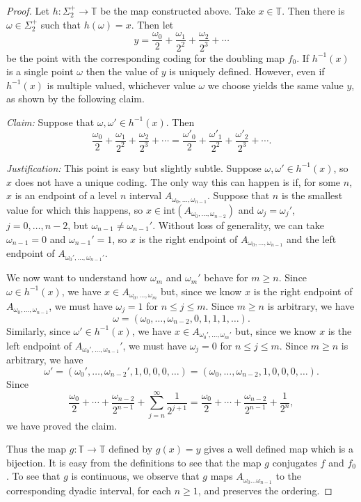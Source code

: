 \documentclass[12pt]{article}
\theoremstyle{definition}
\theoremstyle{remark}
\begin{document}
\begin{proof}
Let $h : \Sigma_2^+ \to \mathbb T$ be the map constructed above.
Take $x \in \mathbb T$. Then there is $\omega \in \Sigma_2^+$ such that $h(\omega)=x$. Then let
\[
y= \frac{\omega_0}{2} + \frac{\omega_1}{2^2} + \frac{\omega_2}{2^3} + \cdots
\]
be the point with the corresponding coding for the doubling map $f_0$. If $h^{-1}(x)$  is a single point
$\omega$
then the value of $y$ is uniquely defined. However, even if $h^{-1}(x)$ is multiple valued, whichever
value $\omega$ we choose yields the same value $y$, as shown by the following claim.

\medskip
\noindent
{\it Claim:} Suppose that $\omega,\omega' \in h^{-1}(x)$. Then
\[
\frac{\omega_0}{2} + \frac{\omega_1}{2^2} + \frac{\omega_2}{2^3} + \cdots
=
\frac{\omega'_0}{2} + \frac{\omega'_1}{2^2} + \frac{\omega'_2}{2^3} + \cdots.
\]

\medskip
\noindent
{\it Justification:} This point is easy but slightly subtle. Suppose $\omega,\omega' \in h^{-1}(x)$,
so $x$ does not have a unique coding.  
The only way this can happen is if, for some $n$, $x$ is an endpoint of a level
$n$ interval 
$A_{\omega_0,\ldots,\omega_{n-1}}$. Suppose that $n$ is the smallest value for which this happens, so $x \in \mathrm{int}(A_{\omega_0,\ldots,\omega_{n-2}})$ and
$\omega_j = \omega_j'$, $j=0,\ldots,n-2$, but $\omega_{n-1} \ne \omega_{n-1}'$. Without
loss of generality, we can take $\omega_{n-1}=0$ and $\omega_{n-1}'=1$, so $x$ is the right endpoint
of $A_{\omega_0,\ldots,\omega_{n-1}}$ and the left endpoint of
$A_{\omega_0',\ldots,\omega_{n-1}'}$. 

We now want to understand how $\omega_m$ and $\omega_m'$ behave for $m \ge n$.
Since $\omega \in h^{-1}(x)$, we have $x \in A_{\omega_0,\ldots,\omega_{m}}$ but, since we know 
$x$ is the right endpoint of $A_{\omega_0,\ldots,\omega_{n-1}}$, we must have
$\omega_j = 1$ for $n \le j \le m$. Since $m \ge n$ is arbitrary, we have
\[
\omega = (\omega_0,\ldots,\omega_{n-2},0,1,1,1,\ldots).
\] 
Similarly, since $\omega' \in h^{-1}(x)$, we have $x \in A_{\omega_0',\ldots,\omega_{m}'}$ but, since we know 
$x$ is the left endpoint of $A_{\omega_0',\ldots,\omega_{n-1}}'$, we must have
$\omega_j = 0$ for $n \le j \le m$. Since $m \ge n$ is arbitrary, we have
\[
\omega' = (\omega_0',\ldots,\omega_{n-2}',1,0,0,0,\ldots)
= (\omega_0,\ldots,\omega_{n-2},1,0,0,0,\ldots).
\] 
Since
\[
\frac{\omega_0}{2} +\cdots +\frac{\omega_{n-2}}{2^{n-1}}
+ \sum_{j=n}^\infty \frac{1}{2^{j+1}} = \frac{\omega_0}{2} +\cdots +\frac{\omega_{n-2}}{2^{n-1}}
+ \frac{1}{2^{n}},
\]
we have proved the claim.

\medskip
Thus the map $g : \mathbb T \to \mathbb T$ defined by
$g(x)=y$ gives a well defined
map which is a bijection.
It is easy from the definitions to see that the map $g$ conjugates $f$ and $f_0$.
To see that $g$ is continuous, we observe that $g$ maps $A_{\omega_0 \ldots \omega_{n-1}}$ to the corresponding dyadic
interval, for each $n \ge 1$, and preserves the ordering.
\end{proof}
\end{document}
